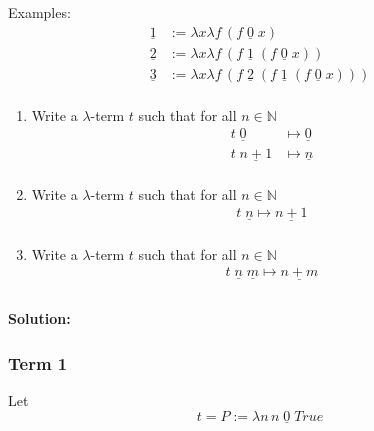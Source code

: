 \documentclass{article}
\begin{document}
Examples:
\begin{equation*}
\begin{split}
\underline{1}&:= \lambda x \lambda f \, (f \; \underline{0} \; x) \\
\underline{2}&:= \lambda x \lambda f \, (f \; \underline{1} \; (f \; \underline{0} \; x) )\\
\underline{3}&:= \lambda x \lambda f \, (f \; \underline{2} \; (f \; \underline{1} \; (f \; \underline{0} \; x) ))\\
\end{split}
\end{equation*}
\begin{enumerate}
\item Write a $\lambda$-term $t$ such that for all $n\in \mathbb{N}$
\begin{equation*}
\begin{split}
t \; \underline{0} &\mapsto \underline{0} \\
t \; \underline{n+1} &\mapsto \underline{n} \\
\end{split}
\end{equation*}
\item Write a $\lambda$-term $t$ such that for all $n\in \mathbb{N}$
\begin{equation*}
\begin{split}
t \; \underline{n} \mapsto \underline{n+1} \\
\end{split}
\end{equation*}
\item Write a $\lambda$-term $t$ such that for all $n\in \mathbb{N}$
\begin{equation*}
\begin{split}
t \; \underline{n}\; \underline{m} \mapsto \underline{n+m} \\
\end{split}
\end{equation*}
\end{enumerate}
\paragraph{Solution:}

\subsubsection*{Term 1}
Let 
\begin{equation*}
t = P := \lambda n \, n \;\underline{0}\; True
\end{equation*}
\end{document}

